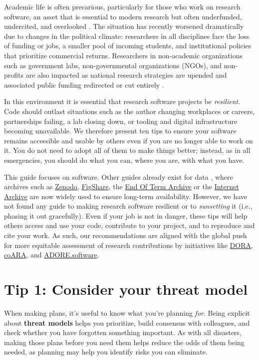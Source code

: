 \documentclass[10pt,letterpaper]{article}
\begin{document}
Academic life is often precarious,
particularly for those who work on research software,
an asset that is essential to modern research \cite{Pearson2025}
but often underfunded, undercited, and overlooked \cite{Carver2022}.
The situation has recently worsened dramatically due to changes in the political climate:
researchers in all disciplines face the loss of funding or jobs,
a smaller pool of incoming students,
and institutional policies that prioritize commercial returns.
Researchers in non-academic organizations
such as government labs, non-governmental organizations (NGOs), and non-profits are also impacted \cite{Woodward2025}
as national research strategies are upended
and associated public funding redirected or cut entirely \cite{Nature2025}.

In this environment it is essential that research software projects be \emph{resilient}.
Code should outlast situations such as the author changing workplaces or careers,
partnerships failing,
a lab closing down,
or tooling and digital infrastructure becoming unavailable.
We therefore present ten tips to ensure your software remains accessible and usable by others
even if you are no longer able to work on it.
You do not need to adopt all of them to make things better;
instead,
as in all emergencies,
you should do what you can,
where you are,
with what you have.

This guide focuses on software.
Other guides already exist for data \cite{Perkel2023},
where archives such as \href{https://zenodo.org/}{Zenodo},
\href{https://figshare.com/}{FigShare},
the \href{https://eotarchive.org/}{End Of Term Archive}
or the \href{http://archive.org/}{Internet Archive}
are now widely used to ensure long-term availability.
However,
we have not found any guide to making research software resilient
or to \emph{sunsetting} it (i.e., phasing it out gracefully).
Even if your job is not in danger,
these tips will help others access and use your code,
contribute to your project,
and to reproduce and cite your work.
As such,
our recommendations
are aligned with the global push for more equitable assessment of research contributions
by initiatives like \href{https://sfdora.org/}{DORA},
\href{https://coara.eu/}{coARA},
and \href{https://adore.software/}{ADORE.software}.

\section*{Tip 1: Consider your threat model}

When making plans, it's useful to know what you're planning \emph{for}.
Being explicit about \textbf{threat models} helps you prioritize,
build consensus with colleagues,
and check whether you have forgotten something important.
As with all disasters,
making those plans before you need them helps reduce the odds of them being needed,
as planning may help you identify risks you can eliminate.
\end{document}
